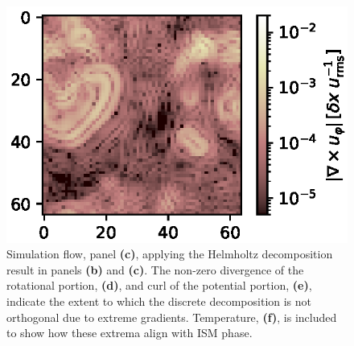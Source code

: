 \documentclass[preprint2]{aastex63}
\begin{document}
\begin{figure}
\includegraphics[trim=1.0cm 0.0cm 0.0cm  0.0cm,clip=true,height=0.22\textwidth]{csc_figs/helm_curl.eps}
\caption{
Simulation flow, panel {\bf{(c)}}, applying the Helmholtz decomposition result
in panels {\bf{(b)}} and {\bf{(c)}}.
The non-zero divergence of the rotational portion, {\bf{(d)}}, and curl of the
potential portion, {\bf{(e)}}, indicate the extent to which the discrete 
decomposition is not orthogonal due to extreme gradients.
Temperature, {\bf{(f)}}, is included to show how these extrema align with ISM phase.
\label{fig:helm_sim}
}
\end{figure}
\end{document}
